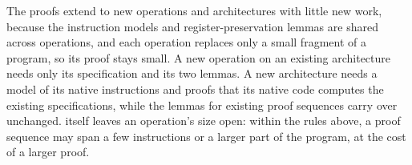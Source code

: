 The proofs extend to new operations and architectures with little new work, because the instruction models and register-preservation lemmas are shared across operations, and each \lang operation replaces only a small fragment of a program, so its proof stays small.
A new operation on an existing architecture needs only its specification and its two lemmas.
A new architecture needs a model of its native instructions and proofs that its native code computes the existing specifications, while the lemmas for existing proof sequences carry over unchanged.
\tool itself leaves an operation's size open: within the rules above, a proof sequence may span a few instructions or a larger part of the program, at the cost of a larger proof.
